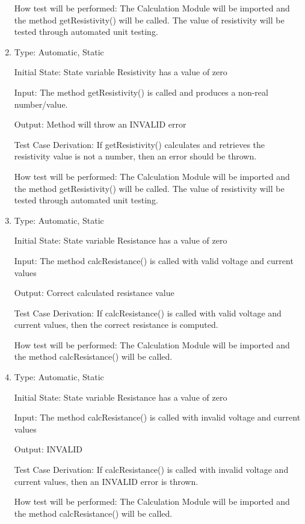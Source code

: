 \documentclass[12pt, titlepage]{article}
\begin{document}
\begin{enumerate}[{UT-C}1.]
  How test will be performed: The Calculation Module will be imported and the method getResistivity() will be called. 
  The value of resistivity will be tested through automated unit testing.
  
  \item
  
  Type: Automatic, Static 

  Initial State: State variable Resistivity has a value of zero

  Input: The method getResistivity() is called and produces a non-real number/value.

  Output: Method will throw an INVALID error

  Test Case Derivation: If getResistivity() calculates and retrieves the resistivity value is not a number, then an error should be thrown.

  How test will be performed: The Calculation Module will be imported and the method getResistivity() will be called. 
  The value of resistivity will be tested through automated unit testing.

  \item
  
  Type: Automatic, Static 

  Initial State: State variable Resistance has a value of zero

  Input: The method calcResistance() is called with valid voltage and current values

  Output: Correct calculated resistance value

  Test Case Derivation: If calcResistance() is called with valid voltage and current values, then the correct resistance is computed.

  How test will be performed: The Calculation Module will be imported and the method calcResistance() will be called. 

  \item
  
  Type: Automatic, Static 

  Initial State: State variable Resistance has a value of zero

  Input: The method calcResistance() is called with invalid voltage and current values

  Output: INVALID

  Test Case Derivation: If calcResistance() is called with invalid voltage and current values, then an INVALID error is thrown.

  How test will be performed: The Calculation Module will be imported and the method calcResistance() will be called. 


\end{enumerate}
\end{document}
